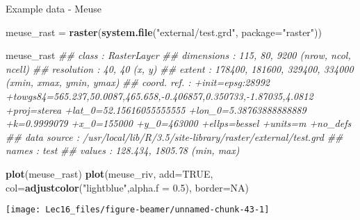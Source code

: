 \documentclass[11pt,ignorenonframetext,]{beamer}
\newenvironment{Shaded}{}{}
\newcommand{\CommentTok}[1]{\textcolor[rgb]{0.38,0.63,0.69}{\textit{#1}}}
\newcommand{\DataTypeTok}[1]{\textcolor[rgb]{0.56,0.13,0.00}{#1}}
\newcommand{\FloatTok}[1]{\textcolor[rgb]{0.25,0.63,0.44}{#1}}
\newcommand{\KeywordTok}[1]{\textcolor[rgb]{0.00,0.44,0.13}{\textbf{#1}}}
\newcommand{\NormalTok}[1]{#1}
\newcommand{\OtherTok}[1]{\textcolor[rgb]{0.00,0.44,0.13}{#1}}
\newcommand{\StringTok}[1]{\textcolor[rgb]{0.25,0.44,0.63}{#1}}
\let\oldShaded\Shaded
\let\endoldShaded\endShaded
\renewenvironment{Shaded}{\footnotesize\begin{spacing}{0.9}\oldShaded}{\endoldShaded\end{spacing}}
\let\oldverbatim\verbatim
\let\endoldverbatim\endverbatim
\newcommand{\scriptoutput}{
  \renewenvironment{Shaded}{\scriptsize\begin{spacing}{0.9}\oldShaded}{\endoldShaded\end{spacing}}
  \renewenvironment{verbatim}{\scriptsize\begin{spacing}{0.9}\oldverbatim}{\endoldverbatim\end{spacing}}
}
\begin{document}
\begin{frame}[fragile,t]{Example data - Meuse}
\protect\hypertarget{example-data---meuse-1}{}

\scriptoutput

\begin{Shaded}
\begin{Highlighting}[]
\NormalTok{meuse_rast =}\StringTok{ }\KeywordTok{raster}\NormalTok{(}\KeywordTok{system.file}\NormalTok{(}\StringTok{"external/test.grd"}\NormalTok{, }\DataTypeTok{package=}\StringTok{"raster"}\NormalTok{))}

\NormalTok{meuse_rast}
\CommentTok{## class       : RasterLayer }
\CommentTok{## dimensions  : 115, 80, 9200  (nrow, ncol, ncell)}
\CommentTok{## resolution  : 40, 40  (x, y)}
\CommentTok{## extent      : 178400, 181600, 329400, 334000  (xmin, xmax, ymin, ymax)}
\CommentTok{## coord. ref. : +init=epsg:28992 +towgs84=565.237,50.0087,465.658,-0.406857,0.350733,-1.87035,4.0812 +proj=sterea +lat_0=52.15616055555555 +lon_0=5.38763888888889 +k=0.9999079 +x_0=155000 +y_0=463000 +ellps=bessel +units=m +no_defs }
\CommentTok{## data source : /usr/local/lib/R/3.5/site-library/raster/external/test.grd }
\CommentTok{## names       : test }
\CommentTok{## values      : 128.434, 1805.78  (min, max)}
\end{Highlighting}
\end{Shaded}

\end{frame}

\begin{frame}[fragile,t]{}
\protect\hypertarget{section-7}{}

\scriptoutput

\begin{Shaded}
\begin{Highlighting}[]
\KeywordTok{plot}\NormalTok{(meuse_rast)}
\KeywordTok{plot}\NormalTok{(meuse_riv, }\DataTypeTok{add=}\OtherTok{TRUE}\NormalTok{, }\DataTypeTok{col=}\KeywordTok{adjustcolor}\NormalTok{(}\StringTok{"lightblue"}\NormalTok{,}\DataTypeTok{alpha.f =} \FloatTok{0.5}\NormalTok{), }\DataTypeTok{border=}\OtherTok{NA}\NormalTok{)}
\end{Highlighting}
\end{Shaded}

\begin{center}\texttt{[image: Lec16\_files/figure-beamer/unnamed-chunk-43-1]} \end{center}

\end{frame}
\end{document}
